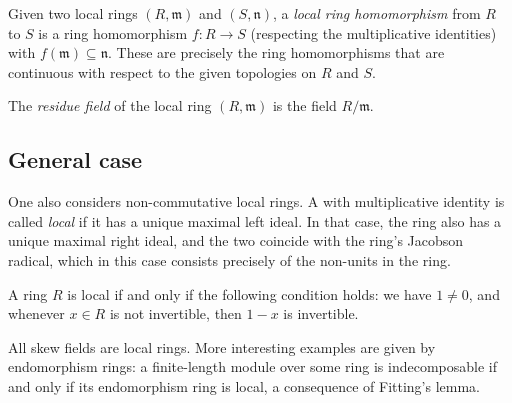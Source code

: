 \documentclass[12pt]{article}
\begin{document}
Given two local rings $(R,\mathfrak{m})$ and $(S,\mathfrak{n})$, a \emph{local ring homomorphism} from $R$ to $S$ is a ring homomorphism $f:R\to S$ (respecting the multiplicative identities) with $f(\mathfrak{m})\subseteq\mathfrak{n}$. These are precisely the ring homomorphisms that are continuous with respect to the given topologies on $R$ and $S$.

The {\em residue field} of the local ring $(R,\mathfrak{m})$ is the field $R/\mathfrak{m}$.

\subsection*{General case}

One also considers non-commutative local rings. A  with multiplicative identity is called \emph{local} if it has a unique maximal left ideal. In that case, the ring also has a unique maximal right ideal, and the two  coincide with the ring's Jacobson radical, which in this case consists precisely of the non-units in the ring.

A ring $R$ is local if and only if the following condition holds: we have $1\not=0$, and whenever $x\in R$ is not invertible, then $1-x$ is invertible.

All skew fields are local rings. More interesting examples are given by endomorphism rings: a finite-length module over some ring is indecomposable if and only if its endomorphism ring is local, a consequence of Fitting's lemma.
\end{document}
